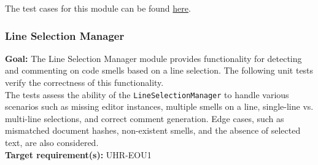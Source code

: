 \documentclass[12pt, titlepage]{article}
\begin{document}
  \noindent The test cases for this module can be found
  \href{https://github.com/ssm-lab/capstone--sco-vs-code-plugin/blob/plugin-multi-file/test/ui/hoverManager.test.ts}{here}.

  \subsubsection{Line Selection Manager}

  \textbf{Goal:} The Line Selection Manager module provides
  functionality for detecting and commenting on code smells based on
  a line selection. The following unit tests verify the correctness
  of this functionality.\\

  \noindent The tests assess the ability of the
  \texttt{LineSelectionManager} to handle various scenarios such as
  missing editor instances, multiple smells on a line, single-line
  vs. multi-line selections, and correct comment generation. Edge
  cases, such as mismatched document hashes, non-existent smells, and
  the absence of selected text, are also considered.\\

  \noindent \textbf{Target requirement(s):} UHR-EOU1~\cite{SRS} \\
\end{document}
